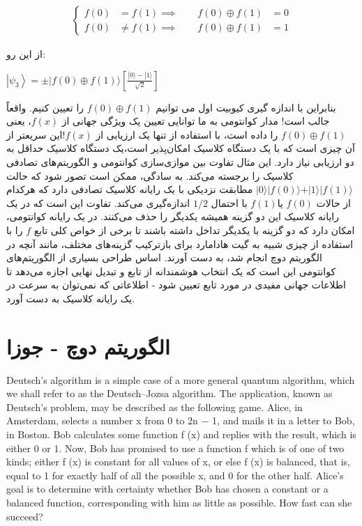 \documentclass{book}
\begin{document}
$$
\begin{aligned}
	\left\{
	\begin{aligned}
		f(0) &= f(1) 
		\implies \qquad f(0) \oplus f(1) &= 0\\
		f(0) &\neq f(1) 
		\implies \qquad f(0) \oplus f(1) &= 1
	\end{aligned}
	\right.
\end{aligned}$$

از این رو:

\begin{center}
	$\left|\psi_3\right\rangle= \pm|f(0) \oplus f(1)\rangle\left[\frac{|0\rangle-|1\rangle}{\sqrt{2}}\right]$
\end{center}
بنابراین با اندازه گیری کیوبیت اول می توانیم $f(0) \oplus f(1)$ را تعیین کنیم. واقعاً جالب است! مدار کوانتومی به ما توانایی تعیین یک ویژگی جهانی از $f(x)$، یعنی$ f(0)\oplus f(1)$ را داده است، با استفاده از تنها یک ارزیابی از $f(x)$!این سریعتر از آن چیزی است که با یک دستگاه کلاسیک امکان‌پذیر است،یک دستگاه کلاسیک حداقل به دو ارزیابی نیاز دارد.
این مثال تفاوت بین موازی‌سازی کوانتومی و الگوریتم‌های تصادفی کلاسیک را برجسته می‌کند. به سادگی، ممکن است تصور شود که حالت $\vert0\rangle \vert f(0) \rangle + \vert1\rangle \vert f(1) \rangle$ مطابقت نزدیکی با یک رایانه کلاسیک تصادفی دارد که هرکدام از حالات $ f (0)$ یا$ f (1) $ با احتمال $1/2$ اندازه‌گیری می‌کند.
تفاوت این است که در یک رایانه کلاسیک این دو گزینه همیشه یکدیگر را حذف می‌کنند. در یک رایانه کوانتومی، امکان دارد که دو گزینه با یکدیگر تداخل داشته باشند تا برخی از خواص کلی تابع $f$ را با استفاده از چیزی شبیه به گیت هادامارد برای بازترکیب گزینه‌های مختلف، مانند آنچه در الگوریتم دوچ انجام شد، به دست آورند.
اساس طراحی بسیاری از الگوریتم‌های کوانتومی این است که یک انتخاب هوشمندانه از تابع و تبدیل نهایی اجازه می‌دهد تا اطلاعات جهانی مفیدی در مورد تابع تعیین شود - اطلاعاتی که نمی‌توان به سرعت در یک رایانه کلاسیک به دست آورد.

\section{الگوریتم دوچ - جوزا}
Deutsch’s algorithm is a simple case of a more general quantum algorithm, which we shall
refer to as the Deutsch–Jozsa algorithm. The application, known as Deutsch’s problem,
may be described as the following game. Alice, in Amsterdam, selects a number x from
0 to 2n − 1, and mails it in a letter to Bob, in Boston. Bob calculates some function
f (x) and replies with the result, which is either 0 or 1. Now, Bob has promised to use
a function f which is of one of two kinds; either f (x) is constant for all values of x,
or else f (x) is balanced, that is, equal to 1 for exactly half of all the possible x, and 0
for the other half. Alice’s goal is to determine with certainty whether Bob has chosen a
constant or a balanced function, corresponding with him as little as possible. How fast
can she succeed?
\end{document}
